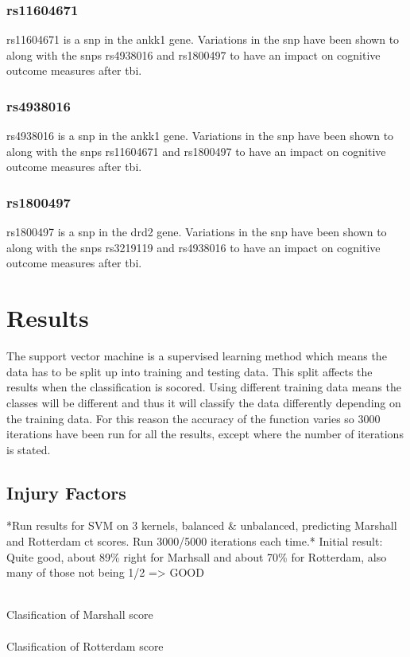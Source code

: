 \documentclass[11pt]{article}
\begin{document}
\subsubsection{rs11604671}
rs11604671 is a \gls{snp} in the \gls{ankk1} gene\cite{Rs11604671SNPedia}. Variations in the \gls{snp} have been shown to along with the \glspl{snp} rs4938016 and rs1800497 to have an impact on cognitive outcome measures after \gls{tbi}.\cite{mcallisterSingleNucleotidePolymorphisms2008}

\subsubsection{rs4938016}
rs4938016 is a \gls{snp} in the \gls{ankk1} gene\cite{mcallisterSingleNucleotidePolymorphisms2008}. Variations in the \gls{snp} have been shown to along with the \glspl{snp} rs11604671 and rs1800497 to have an impact on cognitive outcome measures after \gls{tbi}.\cite{mcallisterSingleNucleotidePolymorphisms2008}

\subsubsection{rs1800497}
rs1800497 is a \gls{snp} in the \gls{drd2} gene\cite{Rs1800497SNPedia}. Variations in the \gls{snp} have been shown to along with the \glspl{snp} rs3219119 and rs4938016 to have an impact on cognitive outcome measures after \gls{tbi}.\cite{mcallisterSingleNucleotidePolymorphisms2008}

\section{Results}
The support vector machine is a supervised learning method which means the data has to be split up into training and testing data. This split affects the results when the classification is socored. Using different training data means the classes will be different and thus it will classify the data differently depending on the training data. For this reason the accuracy of the function varies so 3000 iterations have been run for all the results, except where the number of iterations is stated.

\subsection{Injury Factors}
*Run results for SVM on 3 kernels, balanced \& unbalanced, predicting Marshall and Rotterdam \gls{ct} scores. Run 3000/5000 iterations each time.*
Initial result: Quite good, about 89\% right for Marhsall and about 70\% for Rotterdam, also many of those not being 1/2 => GOOD\\
\\
\begin{center}
  \Large{Clasification of Marshall score}\\
  \\
  \Large{Clasification of Rotterdam score}\\
\end{center}
\end{document}
